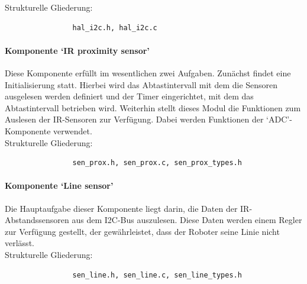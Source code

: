 \documentclass[10pt,a4paper]{article}
\begin{document}
			Strukturelle Gliederung:
				\begin{verbatim}  
				hal_i2c.h, hal_i2c.c
				\end{verbatim}
			
			\paragraph*{Komponente `IR proximity sensor'}
			Diese Komponente erfüllt im wesentlichen zwei Aufgaben.
			Zunächst findet eine Initialisierung statt. Hierbei wird das Abtastintervall mit dem die Sensoren ausgelesen werden definiert und der 
			Timer eingerichtet, mit dem das Abtastintervall betrieben wird.
			Weiterhin stellt dieses Modul die Funktionen zum Auslesen der IR-Sensoren zur Verfügung. Dabei werden Funktionen der `ADC'-Komponente 		
			verwendet. \\
			
			Strukturelle Gliederung:
				\begin{verbatim}  
				sen_prox.h, sen_prox.c, sen_prox_types.h
				\end{verbatim}
			
			\paragraph*{Komponente `Line sensor'}
			Die Hauptaufgabe dieser Komponente liegt darin, die Daten der IR-Abstandssensoren aus dem I2C-Bus auszulesen. Diese Daten werden 
			einem Regler zur Verfügung gestellt, der gewährleistet, dass der Roboter seine Linie nicht verlässt. \\
			
			Strukturelle Gliederung:
				\begin{verbatim}  
				sen_line.h, sen_line.c, sen_line_types.h
				\end{verbatim}
\end{document}

